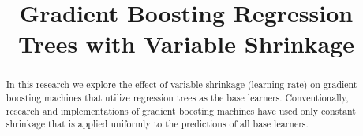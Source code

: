 \documentclass[9pt, conference]{IEEEtran}
\begin{document}
%
\title{Gradient Boosting Regression Trees with Variable Shrinkage}


\author{
\and
{}
}

\maketitle

\begin{abstract}
In this research we explore the effect of variable shrinkage (learning rate) on gradient boosting machines that utilize regression trees as the base learners. Conventionally, research and implementations of gradient boosting machines have used only constant shrinkage that is applied uniformly to the predictions of all base learners.
\end{abstract}





%
\IEEEpeerreviewmaketitle
\end{document}
